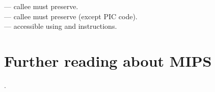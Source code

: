 \AsteriskOne{} --- \Gls{callee} must preserve.\\
\AsteriskTwo{} --- \Gls{callee} must preserve (except \ac{PIC} code).\\
\AsteriskThree{} --- accessible using  and  instructions.\\

\iffalse
FPU:
$f0..$f30
\fi

\section{Further reading about MIPS}

\cite{MIPSRun}.

\fi
